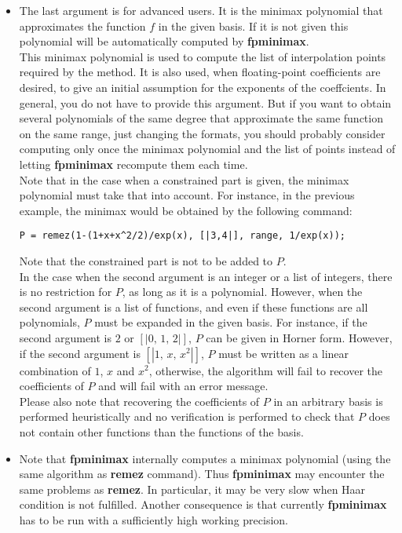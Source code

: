 \begin{itemize}
\item The last argument is for advanced users. It is the minimax polynomial that
   approximates the function $f$ in the given basis. If it is not given
   this polynomial will be automatically computed by \textbf{fpminimax}.
   \\
   This minimax polynomial is used to compute the list of interpolation
   points required by the method. It is also used, when floating-point
   coefficients are desired, to give an initial assumption for the
   exponents of the coeffcients. In general, you do not have to provide this
   argument. But if you want to obtain several polynomials of the same degree
   that approximate the same function on the same range, just changing the
   formats, you should probably consider computing only once the minimax
   polynomial and the list of points instead of letting \textbf{fpminimax} recompute
   them each time.
   \\
   Note that in the case when a constrained part is given, the minimax
   polynomial must take that into account. For instance, in the previous
   example, the minimax would be obtained by the following command:
          \begin{center}\verb~P = remez(1-(1+x+x^2/2)/exp(x), [|3,4|], range, 1/exp(x));~\end{center}
   Note that the constrained part is not to be added to $P$.
   \\
   In the case when the second argument is an integer or a list of integers,
   there is no restriction for $P$, as long as it is a polynomial.
   However, when the second argument is a list of functions, and even if these
   functions are all polynomials, $P$ must be expanded in the given basis.
   For instance, if the second argument is $2$ or $[|0,\,1,\,2|]$, $P$ can be given
   in Horner form. However, if the second argument is $[|1,\,x,\,x^2|]$, $P$ must
   be written as a linear combination of $1$, $x$ and $x^2$, otherwise, the algorithm
   will fail to recover the coefficients of $P$ and will fail with an error
   message.
   \\
   Please also note that recovering the coefficients of $P$ in an arbitrary
   basis is performed heuristically and no verification is performed to check
   that $P$ does not contain other functions than the functions of the basis.

\item Note that \textbf{fpminimax} internally computes a minimax polynomial (using
   the same algorithm as \textbf{remez} command). Thus \textbf{fpminimax} may encounter
   the same problems as \textbf{remez}. In particular, it may be very slow
   when Haar condition is not fulfilled. Another consequence is that
   currently \textbf{fpminimax} has to be run with a sufficiently high working precision.
\end{itemize}
